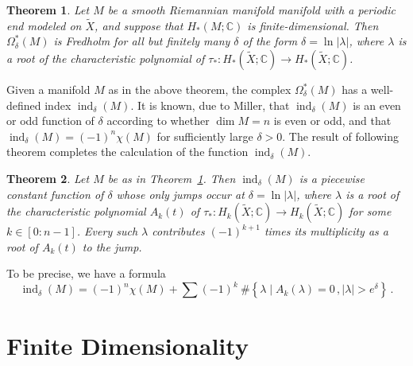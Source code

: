 \documentclass[a4paper, 12pt]{article}
\newtheorem{theorem}{Theorem}[section]
\theoremstyle{definition}
\begin{document}
\begin{theorem}
    \label{thm:Omega_delta_is_Fredholm}
    Let \({ M }\) be a smooth Riemannian manifold manifold with a periodic end modeled on \({ \tilde X }\), and suppose that \({ H_{*}(M; \mathbb C) }\) is finite-dimensional. Then \({ \Omega_{\delta}^*(M) }\) is Fredholm for all but finitely many \({ \delta }\) of the form \({ \delta = \ln \lvert \lambda \rvert }\), where \({ \lambda }\) is a root of the characteristic polynomial of \({ \tau_{*} : H_{*}(\tilde X; \mathbb C) \to H_{*}(\tilde X; \mathbb C) }\).
\end{theorem}

Given a manifold \({ M }\) as in the above theorem, the complex \({ \Omega_{\delta}^*(M) }\) has a well-defined index \({ \operatorname{ind}_{\delta}(M) }\). It is known, due to Miller, that \({ \operatorname{ind}_{\delta}(M) }\) is an even or odd function of \({ \delta }\) according to whether \({ \dim M = n }\) is even or odd, and that \({ \operatorname{ind}_{\delta}(M) = (-1)^{n} \chi(M) }\) for sufficiently large \({ \delta > 0 }\). The result of following theorem completes the calculation of the function \({ \operatorname{ind}_{\delta}(M) }\).

\begin{theorem}
    Let \({ M }\) be as in Theorem~\ref{thm:Omega_delta_is_Fredholm}. Then \({ \operatorname{ind}_{\delta}(M) }\) is a piecewise constant function of \({ \delta }\) whose only jumps occur at \({ \delta = \ln \lvert \lambda \rvert }\), where \({ \lambda }\) is a root of the char\-ac\-ter\-is\-tic polynomial \({ A_{k}(t) }\) of \({ \tau_{*} : H_{k}(\tilde X; \mathbb C) \to H_{k}(\tilde X; \mathbb C) }\) for some \({ k \in [0 : n-1] }\). Every such \({ \lambda }\) contributes \({ (-1)^{k+1} }\) times its multiplicity as a root of \({ A_{k}(t) }\) to the jump.
\end{theorem}

To be precise, we have a formula \[
    \operatorname{ind}_{\delta}(M) = (-1)^{n} \chi(M) + \sum (-1)^{k} \ \#\!\left\{ \lambda \mid A_{k}(\lambda) = 0\,, \lvert \lambda \rvert > e^{\delta} \right\}\,.
\]

\section{Finite Dimensionality}
\end{document}

